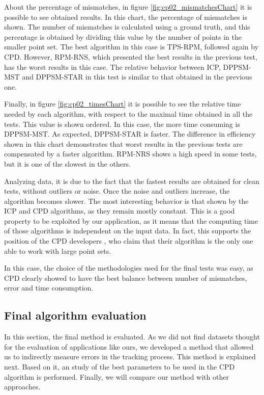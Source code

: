 About the percentage of mismatches, in figure \ref{fig:cp02_mismatchesChart} it is possible to see obtained results. In 
this chart, the percentage of mismatches is shown. The number of mismatches is calculated using a ground truth, and this 
percentage is obtained by dividing this value by the number of points in the smaller point set. The best algorithm in 
this case is TPS-RPM, followed again by CPD. However, RPM-RNS, which presented the best results in the previous test, 
has the worst results in this case. The relative behavior between ICP, DPPSM-MST and DPPSM-STAR in this test is 
similar to that obtained in the previous one.

Finally, in figure \ref{fig:cp02_timesChart} it is possible to see the relative time needed by each algorithm, with respect to 
the maximal time obtained in all the tests. This value is shown ordered. In this case, the more time consuming is 
DPPSM-MST. As expected, DPPSM-STAR is faster. The difference in efficiency shown in this chart demonstrates that worst 
results in the previous tests are compensated by a faster algorithm. RPM-NRS shows a high speed in some tests, but it is 
one of the slowest in the others. 

Analyzing data, it is due to the fact that the fastest results are obtained for clean 
tests, without outliers or noise. Once the noise and outliers increase, the algorithm becomes slower.
The most interesting behavior is that shown by the ICP and CPD algorithms, as they remain mostly constant. This is a good 
property to be exploited by our application, as it means that the computing time of those algorithms is independent on the input data. In fact, this supports the position of the CPD developers \citep{myronenko2010point}, who claim that their algorithm is 
the only one able to work with large point sets.

In this case, the choice of the methodologies used for the final tests was easy, as CPD clearly showed to have the best balance 
between number of mismatches, error and time consumption.

\subsection{Final algorithm evaluation}\label{ch:chapter02_02_03}

In this section, the final method is evaluated. As we did not find datasets thought for the evaluation of applications like ours, we developed a method that allowed us to indirectly measure errors in the tracking process. This method is explained next. Based on it, an study of the best parameters to be used in the CPD algorithm is performed. Finally, we will compare our method with other approaches.

